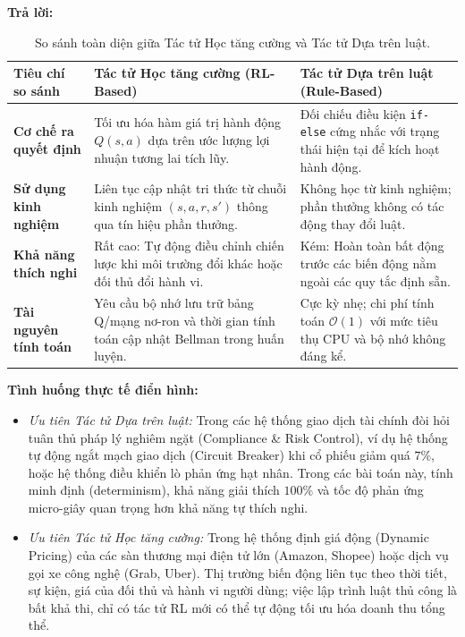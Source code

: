 \documentclass[12pt,a4paper]{article}
\begin{document}
\textbf{Trả lời:}
\begin{table}[H]
\centering
\small
\begin{tabularx}{\linewidth}{p{3.8cm}XX}
\toprule
\textbf{Tiêu chí so sánh} & \textbf{Tác tử Học tăng cường (RL-Based)} & \textbf{Tác tử Dựa trên luật (Rule-Based)} \\
\midrule
\textbf{Cơ chế ra quyết định} & Tối ưu hóa hàm giá trị hành động $Q(s, a)$ dựa trên ước lượng lợi nhuận tương lai tích lũy. & Đối chiếu điều kiện \texttt{if-else} cứng nhắc với trạng thái hiện tại để kích hoạt hành động. \\
\textbf{Sử dụng kinh nghiệm} & Liên tục cập nhật tri thức từ chuỗi kinh nghiệm $(s, a, r, s')$ thông qua tín hiệu phần thưởng. & Không học từ kinh nghiệm; phần thưởng không có tác động thay đổi luật. \\
\textbf{Khả năng thích nghi} & Rất cao: Tự động điều chỉnh chiến lược khi môi trường đổi khác hoặc đối thủ đổi hành vi. & Kém: Hoàn toàn bất động trước các biến động nằm ngoài các quy tắc định sẵn. \\
\textbf{Tài nguyên tính toán} & Yêu cầu bộ nhớ lưu trữ bảng Q/mạng nơ-ron và thời gian tính toán cập nhật Bellman trong huấn luyện. & Cực kỳ nhẹ; chi phí tính toán $\mathcal{O}(1)$ với mức tiêu thụ CPU và bộ nhớ không đáng kể. \\
\bottomrule
\end{tabularx}
\caption{So sánh toàn diện giữa Tác tử Học tăng cường và Tác tử Dựa trên luật.}
\label{tab:comp_rl_rule}
\end{table}

\noindent \textbf{Tình huống thực tế điển hình:}
\begin{itemize}
    \item \textit{Ưu tiên Tác tử Dựa trên luật:} Trong các hệ thống giao dịch tài chính đòi hỏi tuân thủ pháp lý nghiêm ngặt (Compliance \& Risk Control), ví dụ hệ thống tự động ngắt mạch giao dịch (Circuit Breaker) khi cổ phiếu giảm quá $7\%$, hoặc hệ thống điều khiển lò phản ứng hạt nhân. Trong các bài toán này, tính minh định (determinism), khả năng giải thích $100\%$ và tốc độ phản ứng micro-giây quan trọng hơn khả năng tự thích nghi.
    \item \textit{Ưu tiên Tác tử Học tăng cường:} Trong hệ thống định giá động (Dynamic Pricing) của các sàn thương mại điện tử lớn (Amazon, Shopee) hoặc dịch vụ gọi xe công nghệ (Grab, Uber). Thị trường biến động liên tục theo thời tiết, sự kiện, giá của đối thủ và hành vi người dùng; việc lập trình luật thủ công là bất khả thi, chỉ có tác tử RL mới có thể tự động tối ưu hóa doanh thu tổng thể.
\end{itemize}
\end{document}
